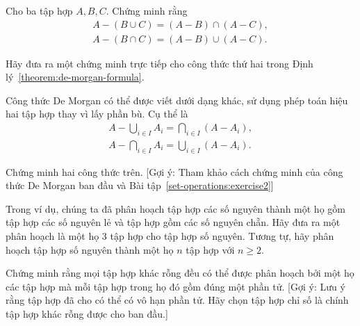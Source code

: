 \begin{exercise}\label{set-operations:exercise2}
    Cho ba tập hợp $A, B, C$. Chứng minh rằng
    \begin{equation*}
        \begin{split}
            A - (B\cup C) = (A - B) \cap (A - C), \\
            A - (B\cap C) = (A - B) \cup (A - C).
        \end{split}
    \end{equation*}
\end{exercise}

\begin{exercise}\label{set-operations:exercise3}
    Hãy đưa ra một chứng minh trực tiếp cho công thức thứ hai trong Định lý~\ref{theorem:de-morgan-formula}.
\end{exercise}

\begin{exercise}\label{set-operations:exercise4}
    Công thức De Morgan có thể được viết dưới dạng khác, sử dụng phép toán hiệu hai tập hợp thay vì lấy phần bù. Cụ thể là
    \begin{equation*}
        \begin{split}
            A - \bigcup_{i\in I}A_{i} = \bigcap_{i\in I}{(A - A_{i})}, \\
            A - \bigcap_{i\in I}A_{i} = \bigcup_{i\in I}{(A - A_{i})}.
        \end{split}
    \end{equation*}

    Chứng minh hai công thức trên. [Gợi ý: Tham khảo cách chứng minh của công thức De Morgan ban đầu và Bài tập~\ref{set-operations:exercise2}]
\end{exercise}

\begin{exercise}\label{set-operations:exercise5}
    Trong ví dụ, chúng ta đã phân hoạch tập hợp các số nguyên thành một họ gồm tập hợp các số nguyên lẻ và tập hợp gồm các số nguyên chẵn. Hãy đưa ra một phân hoạch là một họ 3 tập hợp cho tập hợp số nguyên. Tương tự, hãy phân hoạch tập hợp số nguyên thành một họ $n$ tập hợp với $n\geq 2$.
\end{exercise}

\begin{exercise}\label{set-operations:exercise6}
    Chứng minh rằng mọi tập hợp khác rỗng đều có thể được phân hoạch bởi một họ các tập hợp mà mỗi tập hợp trong họ đó gồm đúng một phần tử. [Gợi ý: Lưu ý rằng tập hợp đã cho có thể có vô hạn phần tử. Hãy chọn tập hợp chỉ số là chính tập hợp khác rỗng được cho ban đầu.]
\end{exercise}

